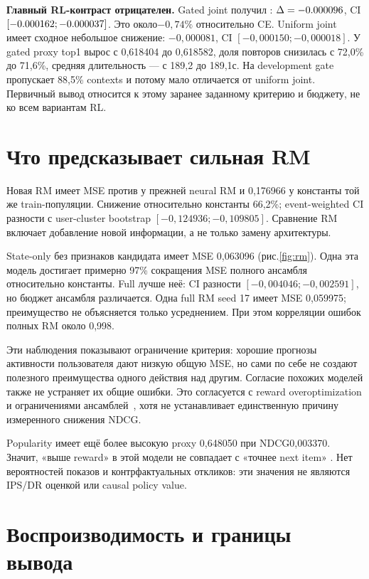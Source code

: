 \documentclass[10pt,a4paper,twocolumn]{article}
\begin{document}
\textbf{Главный RL-контраст отрицателен.} Gated joint получил \GatedNdcg{}:
$\Delta=-0.000096$, CI $[-0.000162;-0.000037]$.
Это около$-0,74\%$ относительно CE. Uniform joint имеет сходное небольшое
снижение: $-0,000081$, CI $[-0,000150;-0,000018]$.
У gated proxy top1 вырос с 0,618404 до 0,618582, доля повторов снизилась
с 72,0\% до 71,6\%, средняя длительность --- с 189,2 до 189,1с.
На development gate пропускает 88,5\% contexts и потому мало отличается
от uniform joint. Первичный вывод относится к этому заранее заданному
критерию и бюджету, не ко всем вариантам RL.



\section{Что предсказывает сильная RM}

Новая RM имеет MSE\RmMse{} против \OldRmMse{} у прежней neural RM
и 0,176966 у константы той же train-популяции. Снижение относительно константы
66,2\%; event-weighted CI разности с user-cluster bootstrap
$[-0,124936;-0,109805]$. Сравнение RM включает добавление новой информации,
а не только замену архитектуры.

State-only без признаков кандидата имеет MSE 0,063096
(рис.\ref{fig:rm}). Одна эта модель достигает примерно 97\% сокращения MSE
полного ансамбля относительно константы. Full лучше неё:
CI разности $[-0,004046;-0,002591]$, но бюджет ансамбля различается.
Одна full RM seed 17 имеет MSE 0,059975; преимущество не объясняется только
усреднением. При этом корреляции ошибок полных RM около 0,998.

Эти наблюдения показывают ограничение критерия: хорошие прогнозы активности
пользователя дают низкую общую MSE, но сами по себе не создают полезного
преимущества одного действия над другим. Согласие похожих моделей также
не устраняет их общие ошибки. Это согласуется с reward overoptimization
и ограничениями ансамблей~\cite{overopt,ensemble}, хотя не устанавливает
единственную причину измеренного снижения NDCG.

Popularity имеет ещё более высокую proxy 0,648050 при NDCG0,003370.
Значит, «выше reward» в этой модели не совпадает с «точнее next item»
. Нет вероятностей показов и контрфактуальных
откликов: эти значения не являются IPS/DR оценкой или causal policy value.



\section{Воспроизводимость и границы вывода}
\end{document}
